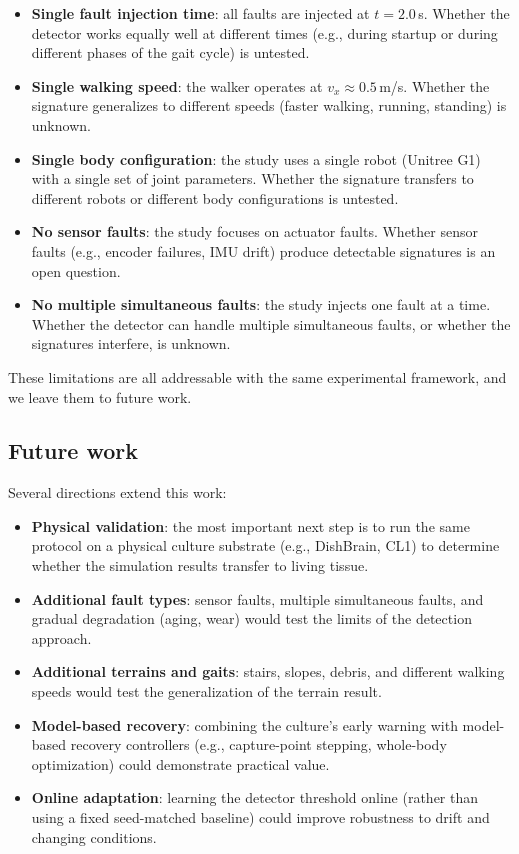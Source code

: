 \begin{itemize}
\item \textbf{Single fault injection time}: all faults are injected at
      $t = 2.0$\,s. Whether the detector works equally well at different times
      (e.g., during startup or during different phases of the gait cycle) is
      untested.
\item \textbf{Single walking speed}: the walker operates at $v_x \approx
      0.5$\,m/s. Whether the signature generalizes to different speeds (faster
      walking, running, standing) is unknown.
\item \textbf{Single body configuration}: the study uses a single robot
      (Unitree G1) with a single set of joint parameters. Whether the signature
      transfers to different robots or different body configurations is untested.
\item \textbf{No sensor faults}: the study focuses on actuator faults. Whether
      sensor faults (e.g., encoder failures, IMU drift) produce detectable
      signatures is an open question.
\item \textbf{No multiple simultaneous faults}: the study injects one fault at
      a time. Whether the detector can handle multiple simultaneous faults, or
      whether the signatures interfere, is unknown.
\end{itemize}

These limitations are all addressable with the same experimental framework,
and we leave them to future work.

\subsection{Future work}

Several directions extend this work:

\begin{itemize}
\item \textbf{Physical validation}: the most important next step is to run the
      same protocol on a physical culture substrate (e.g., DishBrain, CL1) to
      determine whether the simulation results transfer to living tissue.
\item \textbf{Additional fault types}: sensor faults, multiple simultaneous
      faults, and gradual degradation (aging, wear) would test the limits of
      the detection approach.
\item \textbf{Additional terrains and gaits}: stairs, slopes, debris, and
      different walking speeds would test the generalization of the terrain
      result.
\item \textbf{Model-based recovery}: combining the culture's early warning
      with model-based recovery controllers (e.g., capture-point stepping,
      whole-body optimization) could demonstrate practical value.
\item \textbf{Online adaptation}: learning the detector threshold online
      (rather than using a fixed seed-matched baseline) could improve
      robustness to drift and changing conditions.
\end{itemize}

